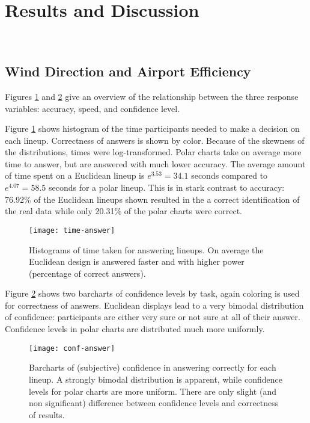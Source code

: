 \section{Results and Discussion}~\label{results}
%
\subsection{Wind Direction and Airport Efficiency}



Figures \ref{fig:time} and \ref{fig:conf} give an overview of the relationship between the three response variables: accuracy, speed, and confidence level.

Figure \ref{fig:time} shows histogram of the time participants needed to make a decision on each lineup. Correctness of answers is shown by color.  Because of the skewness of the distributions, times were log-transformed. Polar charts take on average more time to answer, but are answered with much lower accuracy. 
The average amount of time spent on a Euclidean lineup is $e^{3.53} = 34.1$ seconds compared to $e^{4.07}=58.5$ seconds for a polar lineup.
This is in stark contrast to accuracy: 76.92\% of the Euclidean lineups shown resulted in the a correct identification of the real data while only 20.31\% of the polar charts were correct.


\begin{figure}[hbtp] %
   \centering
   \texttt{[image: time-answer]} 
   \caption{Histograms of time taken for answering lineups. On average the Euclidean design is answered faster and with higher power (percentage of correct answers). }
   \label{fig:time}
\end{figure}

Figure \ref{fig:conf} shows two barcharts of confidence levels by task, again coloring is used for correctness of answers. Euclidean displays lead to a very bimodal distribution of confidence: participants are either very sure or not sure at all of their answer. Confidence levels in polar charts are distributed much more uniformly.
\begin{figure}[hbtp] %
   \centering
   \texttt{[image: conf-answer]} 
   \caption{Barcharts of (subjective) confidence in answering correctly for each lineup. A strongly bimodal distribution is apparent, while confidence levels for polar charts are more uniform. There are only slight (and non significant) difference between confidence levels and correctness of results.}
   \label{fig:conf}
\end{figure}

